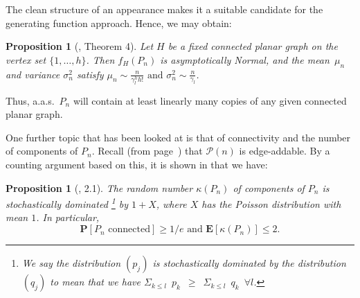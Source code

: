 \documentclass{article}
\newtheorem{Proposition}[Theorem]{Proposition}
\newtheorem{Proof of Theorem}{Proof of Theorem}
\begin{document}
The clean structure of an appearance makes it a suitable candidate for the generating function approach.
Hence, we may obtain:















\begin{Proposition}[\cite{gim}, Theorem 4] \label{gim T4}
Let $H$ be a fixed connected planar graph on the vertex set $\{ 1,\ldots,h \}$.
Then $f_{H}(P_{n})$ is asymptotically Normal, and the mean~$\mu_{n}$ and variance $\sigma_{n}^{2}$ satisfy
$\mu_{n} \sim \frac{n}{\gamma_{l}^{h}h!} \textrm{ and } \sigma_{n}^{2} \sim \frac{n}{\gamma_{l}}$.  
\end{Proposition} 
\phantom{p} 





Thus, a.a.s.~$P_{n}$ will contain at least linearly many copies of any given connected planar graph. \\
\begin{displaymath}
\end{displaymath} 















One further topic that has been looked at is that of connectivity 
and the number of components of $P_{n}$.
Recall (from page~\pageref{planar}) that $\mathcal{P}(n)$ is edge-addable.
By a counting argument based on this,
it is shown in \cite{mcd} that we have:















\begin{Proposition}[\cite{mcd}, 2.1] \label{mcd 2.1}
The random number $\kappa (P_{n})$ of components of $P_{n}$ 
is stochastically dominated 
\footnote{We say the distribution $(p_{j})$ is \textit{stochastically dominated} by the distribution $(q_{j})$ 
to mean that we have 
$\Sigma_{k \leq l} \phantom{p} p_{k} \phantom{p} \geq 
\phantom{p} \Sigma_{k \leq l} \phantom{p} q_{k} \phantom{p} \forall l$.}
by $1+X$, 
where $X$ has the Poisson distribution with mean $1$.
In particular, 
\begin{displaymath}
\mathbf{P} [P_{n} \textrm{ connected} ] \geq 1/e \textrm{ and } \mathbf{E}[\kappa (P_{n})] \leq 2. 
\end{displaymath}
\end{Proposition} 
\phantom{p}
\end{document}
